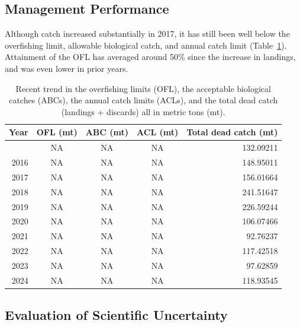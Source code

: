 \documentclass[
]{scrartcl}
\begin{document}
\endgroup

\subsection{Management Performance}\label{management-performance}

Although catch increased substantially in 2017, it has still been well
below the overfishing limit, allowable biological catch, and annual
catch limit (Table~\ref{tbl-es-management}). Attainment of the OFL has
averaged around 50\% since the increase in landings, and was even lower
in prior years.

\begingroup
\fontsize{9.0pt}{10.8pt}\selectfont

\begin{longtable}{rcccr}

\caption{\label{tbl-es-management}Recent trend in the overfishing limits
(OFL), the acceptable biological catches (ABCs), the annual catch limits
(ACLs), and the total dead catch (landings + discards) all in metric
tons (mt).}

\tabularnewline

\toprule
Year & OFL (mt) & ABC (mt) & ACL (mt) & Total dead catch (mt) \\ 
\midrule\addlinespace[2.5pt]
2015 & NA & NA & NA & 132.09211 \\ 
2016 & NA & NA & NA & 148.95011 \\ 
2017 & NA & NA & NA & 156.01664 \\ 
2018 & NA & NA & NA & 241.51647 \\ 
2019 & NA & NA & NA & 226.59244 \\ 
2020 & NA & NA & NA & 106.07466 \\ 
2021 & NA & NA & NA & 92.76237 \\ 
2022 & NA & NA & NA & 117.42518 \\ 
2023 & NA & NA & NA & 97.62859 \\ 
2024 & NA & NA & NA & 118.93545 \\ 
\bottomrule

\end{longtable}

\endgroup

\subsection{Evaluation of Scientific
Uncertainty}\label{evaluation-of-scientific-uncertainty}
\end{document}
